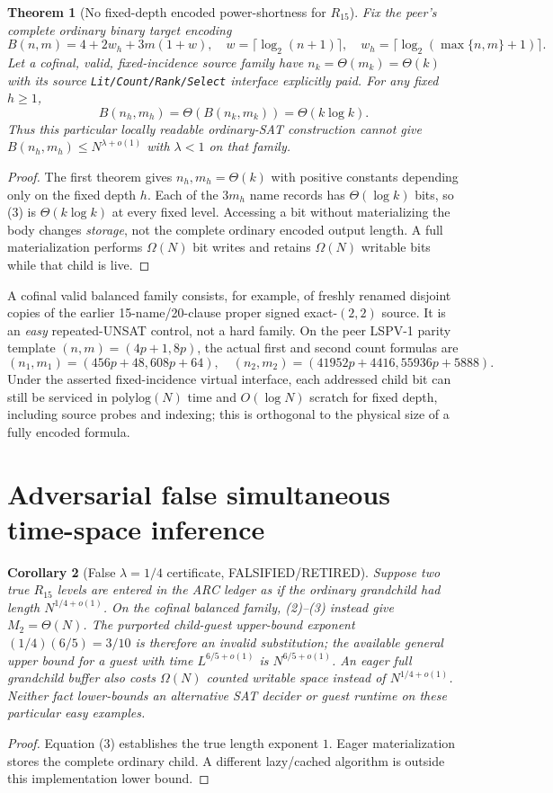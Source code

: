 \documentclass[11pt]{article}
\newtheorem{theorem}{Theorem}[section]
\newtheorem{corollary}[theorem]{Corollary}
\begin{document}
\begin{theorem}[No fixed-depth encoded power-shortness for $R_{15}$]
Fix the peer's complete ordinary binary target encoding
\[
B(n,m)=4+2w_h+3m(1+w),\quad
w=\lceil\log_2(n+1)\rceil,\quad
w_h=\lceil\log_2(\max\{n,m\}+1)\rceil.
\tag{3}
\]
Let a cofinal, valid, fixed-incidence source family have
$n_k=\Theta(m_k)=\Theta(k)$ with its source \texttt{Lit/Count/Rank/Select}
interface explicitly paid. For any \emph{fixed} $h\ge1$,
\[
B(n_h,m_h)=\Theta(B(n_k,m_k))=\Theta(k\log k).
\]
Thus \emph{this particular} locally readable ordinary-SAT construction cannot
give $B(n_h,m_h)\le N^{\lambda+o(1)}$ with $\lambda<1$ on that family.
\end{theorem}
\begin{proof}
The first theorem gives $n_h,m_h=\Theta(k)$ with positive constants depending only on the fixed depth $h$. Each of the $3m_h$ name records has $\Theta(\log k)$ bits, so (3) is $\Theta(k\log k)$ at every fixed level. Accessing a bit without materializing the body changes \emph{storage}, not the complete ordinary encoded output length. A full materialization performs $\Omega(N)$ bit writes and retains $\Omega(N)$ writable bits while that child is live.
\end{proof}
A cofinal valid balanced family consists, for example, of freshly renamed disjoint copies of the earlier 15-name/20-clause proper signed exact-$(2,2)$ source. It is an \emph{easy} repeated-UNSAT control, not a hard family. On the peer LSPV-1 parity template $(n,m)=(4p+1,8p)$, the actual first and second count formulas are
\[
(n_1,m_1)=(456p+48,608p+64),\quad
(n_2,m_2)=(41952p+4416,55936p+5888).
\]
Under the asserted fixed-incidence virtual interface, each addressed child bit can still be serviced in $\mathrm{polylog}(N)$ time and $O(\log N)$ scratch for fixed depth, including source probes and indexing; this is orthogonal to the physical size of a fully encoded formula.

\section{Adversarial false simultaneous time-space inference}
\begin{corollary}[False $\lambda=1/4$ certificate, FALSIFIED/RETIRED]
Suppose two true $R_{15}$ levels are entered in the ARC ledger as if the
ordinary grandchild had length $N^{1/4+o(1)}$. On the cofinal balanced
family, (2)--(3) instead give $M_2=\Theta(N)$.
The purported child-guest upper-bound exponent $(1/4)(6/5)=3/10$
is therefore an \emph{invalid substitution}; the available general upper
bound for a guest with time $L^{6/5+o(1)}$ is $N^{6/5+o(1)}$.
An eager full grandchild buffer also costs $\Omega(N)$
counted writable space instead of $N^{1/4+o(1)}$.
Neither fact lower-bounds an \emph{alternative} SAT decider or guest runtime
on these particular easy examples.
\end{corollary}
\begin{proof}
Equation (3) establishes the true length exponent $1$.
Eager materialization stores the complete ordinary child. A different
lazy/cached algorithm is outside this implementation lower bound.
\end{proof}
\end{document}
